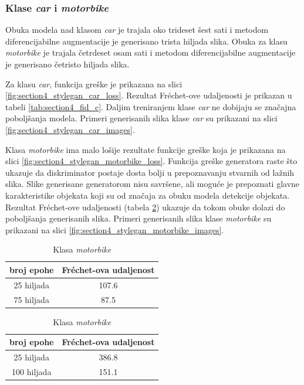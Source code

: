 \documentclass[12pt,oneside]{memoir}
\begin{document}
\subsubsection{Klase \textit{car} i \textit{motorbike}}

Obuka modela nad klasom \textit{car} je trajala oko trideset šest sati i metodom diferencijabilne augmentacije je generisano trista hiljada slika. Obuka za klasu \textit{motorbike} je trajala četrdeset osam sati i metodom diferencijabilne augmentacije je generisano četristo hiljada slika.

Za klasu \textit{car}, funkcija greške je prikazana na slici \ref{fig:section4_stylegan_car_loss}. Rezultat Fréchet-ove udaljenosti je prikazan u tabeli \ref{tab:section4_fid_c}. Daljim treniranjem klase \textit{car} ne dobijaju se značajna poboljšanja modela.
Primeri generisanih slika klase \textit{car} su prikazani na slici \ref{fig:section4_stylegan_car_images}.

Klasa \textit{motorbike} ima malo lošije rezultate funkcije greške koja je prikazana na slici \ref{fig:section4_stylegan_motorbike_loss}. Funkcija greške generatora raste što ukazuje da diskriminator postaje dosta bolji u prepoznavanju stvarnih od lažnih slika. Slike generisane generatorom nisu savršene, ali moguće je prepoznati glavne karakteristike objekata koji su od značaja za obuku modela detekcije objekata. Rezultat Fréchet-ove udaljenosti (tabela \ref{tab:section4_fid_m}) ukazuje da tokom obuke dolazi do poboljšanja generisanih slika. Primeri generisanih slika klase \textit{motorbike} su prikazani na slici \ref{fig:section4_stylegan_motorbike_images}.

\begin{table}[!htb]
    \begin{minipage}{.5\linewidth}
      \caption{Klasa \textit{car}}\label{tab:section4_fid_c}
      \centering
        \begin{tabular}{c|c}
        broj epohe &  Fréchet-ova udaljenost \\
        \hline
        25 hiljada & 107.6 \\
        \hline
        75 hiljada & 87.5 \\
        \end{tabular}
    \end{minipage}%
    \begin{minipage}{.5\linewidth}
      \centering
        \caption{Klasa \textit{motorbike}}\label{tab:section4_fid_m}
        \begin{tabular}{c|c}
        broj epohe &  Fréchet-ova udaljenost \\
        \hline
        25 hiljada & 386.8 \\
        \hline
        100 hiljada & 151.1 \\
        \end{tabular}
    \end{minipage} 
\end{table}
\end{document}
